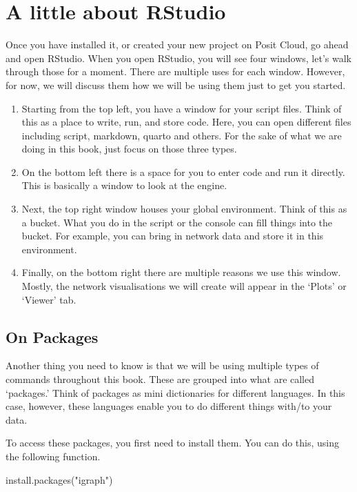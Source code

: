 \documentclass[
  letterpaper,
  DIV=11,
  numbers=noendperiod]{scrreprt}
\newenvironment{Shaded}{\begin{snugshade}}{\end{snugshade}}
\newcommand{\FunctionTok}[1]{\textcolor[rgb]{0.28,0.35,0.67}{#1}}
\newcommand{\NormalTok}[1]{\textcolor[rgb]{0.00,0.23,0.31}{#1}}
\newcommand{\StringTok}[1]{\textcolor[rgb]{0.13,0.47,0.30}{#1}}
\begin{document}
\section{A little about RStudio}\label{a-little-about-rstudio}

Once you have installed it, or created your new project on Posit Cloud,
go ahead and open RStudio. When you open RStudio, you will see four
windows, let's walk through those for a moment. There are multiple uses
for each window. However, for now, we will discuss them how we will be
using them just to get you started.

\begin{enumerate}
\def\labelenumi{\arabic{enumi}.}
\item
  Starting from the top left, you have a window for your script files.
  Think of this as a place to write, run, and store code. Here, you can
  open different files including script, markdown, quarto and others.
  For the sake of what we are doing in this book, just focus on those
  three types.
\item
  On the bottom left there is a space for you to enter code and run it
  directly. This is basically a window to look at the engine.
\item
  Next, the top right window houses your global environment. Think of
  this as a bucket. What you do in the script or the console can fill
  things into the bucket. For example, you can bring in network data and
  store it in this environment.
\item
  Finally, on the bottom right there are multiple reasons we use this
  window. Mostly, the network visualisations we will create will appear
  in the `Plots' or `Viewer' tab.
\end{enumerate}

\subsection{On Packages}\label{on-packages}

Another thing you need to know is that we will be using multiple types
of commands throughout this book. These are grouped into what are called
`packages.' Think of packages as mini dictionaries for different
languages. In this case, however, these languages enable you to do
different things with/to your data.

To access these packages, you first need to install them. You can do
this, using the following function.

\begin{Shaded}
\begin{Highlighting}[]
\FunctionTok{install.packages}\NormalTok{(}\StringTok{"igraph"}\NormalTok{)}
\end{Highlighting}
\end{Shaded}
\end{document}
